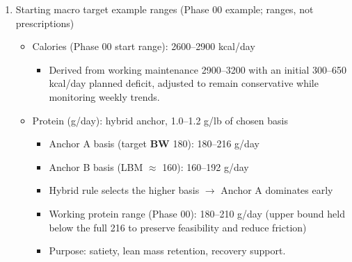 \documentclass[10pt]{article}
\begin{document}
\begin{enumerate}
\begin{itemize}
\item Weight-loss guardrail: planned average loss \textbf{MUST} NOT exceed 0.5\% bodyweight/week.
  \begin{itemize}
  \item 0.5\% of 266 lb = 1.33 lb/week (maximum planned average).
  \item Energy equivalent: 1.33 \ensuremath{\times} 3500 $\approx$ 4655 kcal/week \textrightarrow\ $\approx$ 665 kcal/day deficit ceiling (planned average).
  \end{itemize}
\item Phase 00 initial planned deficit range: 300–650 kcal/day below working maintenance.
  \begin{itemize}
  \item This is a planned range; weekly review using weekly bodyweight average governs whether it is held, reduced, or raised to maintain the guardrail.
  \end{itemize}
\newpage
\item Adherence and safety notes:
  \begin{itemize}
  \item If red-flag symptoms occur (dizziness/fainting, chest pain/pressure, syncope/near-syncope, severe GI distress, heat illness signs), stop and follow escalation posture; the plan is suspended until safe to resume.
  \item If weekly average loss exceeds the 0.5\% guardrail, reduce deficit immediately (move calories toward maintenance).
  \end{itemize}
\end{itemize}

\item Starting macro target example ranges (Phase 00 example; ranges, not prescriptions)

\begin{itemize}
\item Calories (Phase 00 start range): 2600–2900 kcal/day
  \begin{itemize}
  \item Derived from working maintenance 2900–3200 with an initial 300–650 kcal/day planned deficit, adjusted to remain conservative while monitoring weekly trends.
  \end{itemize}

\item Protein (g/day): hybrid anchor, 1.0–1.2 g/lb of chosen basis
  \begin{itemize}
  \item Anchor A basis (target \textbf{BW} 180): 180–216 g/day
  \item Anchor B basis (LBM $\approx$ 160): 160–192 g/day
  \item Hybrid rule selects the higher basis $\to$ Anchor A dominates early
  \item Working protein range (Phase 00): 180–210 g/day (upper bound held below the full 216 to preserve feasibility and reduce friction)
  \item Purpose: satiety, lean mass retention, recovery support.
  \end{itemize}


\end{itemize}
\end{enumerate}
\end{document}
